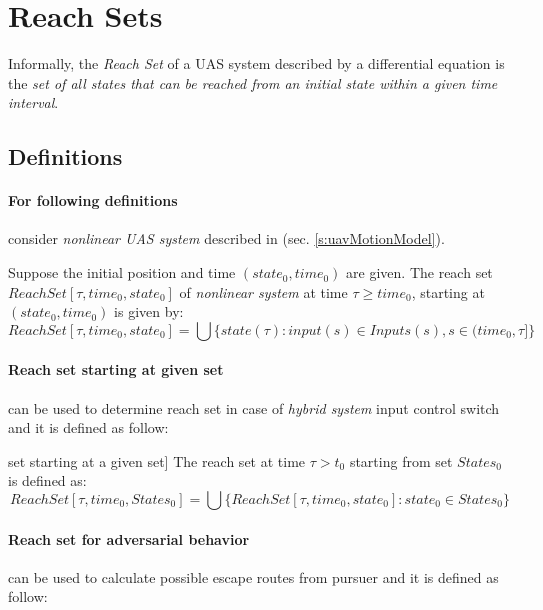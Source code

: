 \section{Reach Sets}\label{s:ReachSets}
    \noindent Informally, the \emph{Reach Set} of a UAS system described by a differential equation is the \emph{set of all states that can be reached from an initial state within a given time interval}.

\subsection{Definitions}\label{sec:reachSetIncrementalDefinition}
    \paragraph{For following definitions} consider \emph{nonlinear UAS system} described in (sec. \ref{s:uavMotionModel}).
    
    \begin{definition}\label{def:reachset01}
        Suppose the initial position
        and time $(state_0, time_0)$ are given. The reach set $ReachSet[\tau, time_0, state_0]$ of \emph{nonlinear system} at time $\tau \ge time_0$, starting at $(state_0, time_0)$ is given by:
        \begin{equation}
            ReachSet[\tau, time_0, state_0] = \bigcup \{state(\tau):input(s)\in Inputs(s),s \in (time_0,\tau]\}
        \end{equation}
    \end{definition}
    
    \paragraph{Reach set starting at given set} can be used to determine reach set in case of \emph{hybrid system} input control switch and it is defined as follow:
    \begin{definition}\label{def:ReachSetBasic} set starting at a given set]
        The reach set at time $\tau > t_0$ starting from set $States_0$ is defined as:
        \begin{equation}
            ReachSet[\tau, time_0, States_0] = \bigcup \{ReachSet[\tau, time_0, state_0]: state_0 \in States_0\}
        \end{equation}
    \end{definition}

    \paragraph{Reach set for adversarial behavior} can be used to calculate possible escape routes from pursuer and it is defined as follow:

